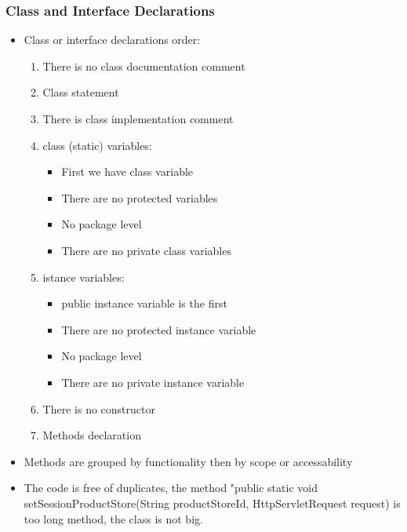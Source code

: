 \subsubsection{Class and Interface Declarations}
\begin{itemize}
\item Class or interface declarations order:
\begin{enumerate}
\item There is no class documentation comment
\item Class statement
\item There is class implementation comment
\item class (static) variables:
\begin{itemize}
\item First we have class variable
\item There are no protected variables
\item No package level 
\item There are no private class variables
\end{itemize}
\item istance variables:
\begin{itemize}
\item public instance variable is the first
\item There are no protected instance variable
\item No package level 
\item There are no private instance variable 
\end{itemize}
\item There is no constructor
\item Methods declaration
\end{enumerate}
\item Methods are grouped by functionality then by scope or accessability
\item The code is free of duplicates, the method "public static void setSessionProductStore(String productStoreId, HttpServletRequest request) is too long method, the class is not big. 
\end{itemize}

